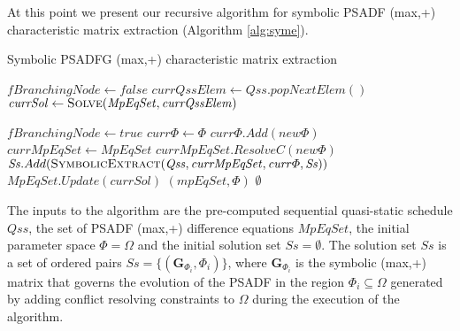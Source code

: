 \documentclass[]{eptcs}
\begin{document}
At this point we present our recursive algorithm for symbolic PSADF (max,+) characteristic matrix extraction (Algorithm \ref{alg:syme}).
\begin{algorithm}[!ht]
\caption{Symbolic PSADFG (max,+) characteristic matrix extraction}\label{alg:syme}
\begin{algorithmic}[1]
	\State $ \mathit{fBranchingNode \leftarrow fals}e$
	 \label{line:sched}
		\State $\mathit{currQssElem \leftarrow Qss.popNextElem()}$
		\State $\mathit{currSol} \leftarrow \Call{Solve}{$$\mathit{MpEqSet,currQssElem}$$}$ \label{line:solve}
		
			\State $\mathit{fBranchingNode \leftarrow true} $ \label{line:branch}
			 	\label{line:branch1}
				 \label{line:feas}
					\State $\mathit{ curr\varPhi \leftarrow \varPhi}$
					\State $\mathit{curr\varPhi.Add(new\varPhi)} $	\label{line:addnewc}
					\State $\mathit{currMpEqSet \leftarrow MpEqSet}$
					\State $\mathit{currMpEqSet.ResolveC(new\varPhi)} $	\label{line:resolve}
					\State $\mathit{Ss}.Add(\Call{SymbolicExtract}{$$\mathit{Qss,currMpEqSet,curr\varPhi,Ss}$$)}$ \label{line:branchs}
				\EndIf
			\EndWhile
		\Else
			\State $\mathit{MpEqSet.Update(currSol)} $ \label{line:addsole}
		\EndIf
	\EndWhile\label{schedulewhile}
		\State  \Return $\mathit{(mpEqSet, \varPhi)}$ \label{line:end}
	\Else \State \Return $\emptyset$ \label{line:bla}
	\EndIf
\EndFunction
\end{algorithmic}
\end{algorithm}
\nopagebreak
The inputs to the algorithm are the pre-computed sequential quasi-static schedule $\mathit{Qss}$, the set of PSADF (max,+) difference equations $\mathit{MpEqSet}$, the initial parameter space $\varPhi=\Omega$ and the initial solution set $\mathit{Ss}=\emptyset$. The solution set $\mathit{Ss}$ is a set of ordered pairs $\mathit{Ss}=\{(\mathbf{G}_{\varPhi_i}, \varPhi_i)\}$, where $\mathbf{G}_{\varPhi_i}$ is the symbolic (max,+) matrix that governs the evolution of the PSADF in the region $\varPhi_i \subseteq \Omega$ generated by adding conflict resolving constraints to $\Omega$ during the execution of the algorithm.
\end{document}
